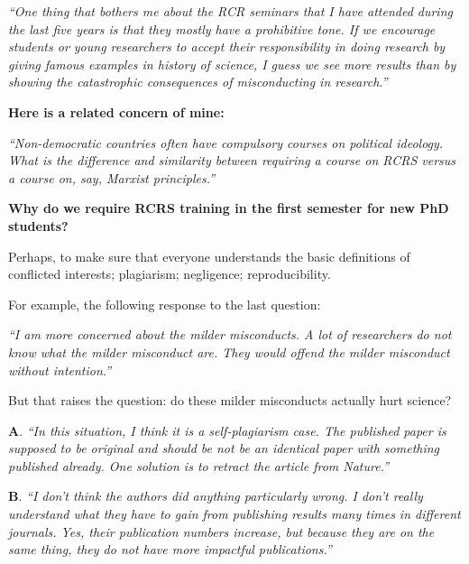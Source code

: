 \documentclass[portrait,11pt]{seminar}
\begin{document}

{\it ``One thing that bothers me about the RCR seminars that I have attended during the last five years is that they mostly have a prohibitive tone. If we encourage students or young researchers to accept their responsibility in doing research by giving famous examples in history of science, I guess we see more results than by showing the catastrophic consequences of misconducting in research.''}

\medskip

{\bf Here is a related concern of mine:}

{\it ``Non-democratic countries often have compulsory courses on political ideology. What is the difference and similarity between requiring a course on RCRS versus a course on, say, Marxist principles.''}

\es

\bs
{\bf Why do we require RCRS training in the first semester for new PhD students?}

\medskip

Perhaps, to make sure that everyone understands the basic definitions of conflicted interests; plagiarism; negligence; reproducibility. 

For example, the following response to the last question:

{\it ``I am more concerned about the milder misconducts. A lot of researchers do not know what the milder misconduct are. They would offend the milder misconduct without intention.''}

But that raises the question: do these milder misconducts actually hurt science?
 
\es


{\bf A}. {\it ``In this situation, I think it is a self-plagiarism case. The published paper is supposed to be original and should be not be an identical paper with something published already. One solution is to retract the article from Nature.''}


{\bf B}. {\it ``I don’t think the authors did anything particularly wrong. I don’t really understand what they have to gain from publishing results many times in different journals. Yes, their publication numbers increase, but because they are on the same thing, they do not have more impactful publications.''}
\end{document}

